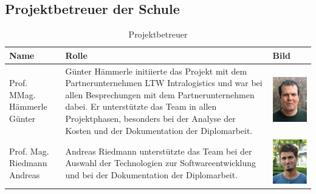 \subsection{Projektbetreuer der Schule}
\begin{table}[H]
  \begin{center}
    \begin{tabular}{|p{}|p{}|p{}|}
      \hline
      \textbf{Name}               & \textbf{Rolle}                                                                                                                                                                                                                                                                       & \textbf{Bild}                                                                             \\
      \hline
      Prof. MMag. Hämmerle Günter & Günter Hämmerle initiierte das Projekt mit dem Partnerunternehmen LTW Intralogistics und war bei allen Besprechungen mit dem Partnerunternehmen dabei. Er unterstützte das Team in allen Projektphasen, besonders bei der Analyse der Kosten und der Dokumentation der Diplomarbeit. & \begin{minipage}{.3\textwidth} \includegraphics{images/günterhämmerle.jpg} \end{minipage} \\
      \hline
      Prof. Mag. Riedmann Andreas & Andreas Riedmann unterstützte das Team bei der Auswahl der Technologien zur Softwareentwicklung und bei der Dokumentation der Diplomarbeit.                                                                                                                                          & \begin{minipage}{.3\textwidth}\includegraphics{images/andreasriedmann.jpg} \end{minipage} \\
      \hline
    \end{tabular}
    \caption{Projektbetreuer}
    \label{tab:projektbetreuer}
  \end{center}
\end{table}
